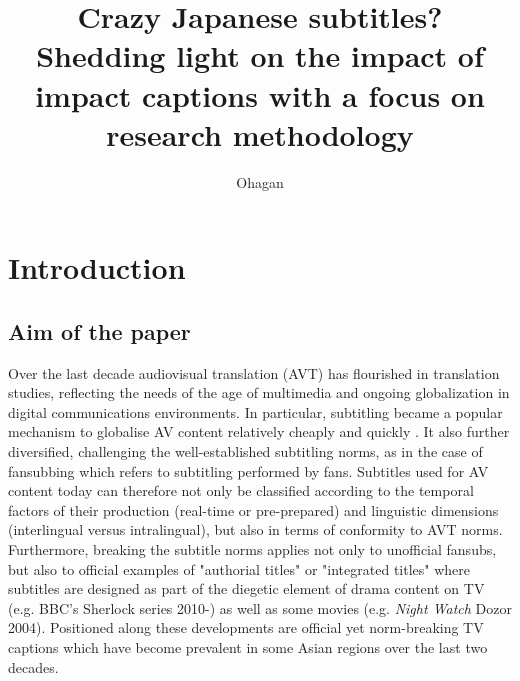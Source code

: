 \documentclass[output=paper]{langsci/langscibook}
\title{Crazy {Japanese} subtitles? {S}hedding light on the impact of impact captions with a focus on research methodology}
\author{Ohagan
}
\begin{document}
 
\section{ Introduction}

\subsection{Aim of the paper}

Over the last decade audiovisual translation (AVT) has flourished in translation studies, reflecting the needs of the age of multimedia and ongoing globalization in digital communications environments. In particular, subtitling became a popular mechanism to globalise AV content relatively cheaply and quickly \citep[pg. 274]{diaz2013}. It also further diversified, challenging the well-established subtitling norms, as in the case of fansubbing which refers to subtitling performed by fans. Subtitles used for AV content today can therefore not only be classified according to the temporal factors of their production (real-time or pre-prepared) and linguistic dimensions (interlingual versus intralingual), but also in terms of conformity to AVT norms.   Furthermore, breaking the subtitle norms applies not only to unofficial fansubs, but also to official examples of "authorial titles" \citep{perezgonzalez2012} or "integrated titles" \citep{Fox2013} where subtitles are designed as part of the diegetic element of drama content on TV (e.g. BBC's Sherlock series 2010-) as well as some movies (e.g. \textit{Night Watch} Dozor 2004). Positioned along these developments are official yet norm-breaking TV captions which have become prevalent in some Asian regions over the last two decades.   
\end{document}
